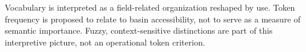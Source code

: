 Vocabulary is interpreted as a field-related organization reshaped by use.
Token frequency is proposed to relate to basin accessibility, not to serve
as a measure of semantic importance. Fuzzy, context-sensitive distinctions
are part of this interpretive picture, not an operational token criterion.
